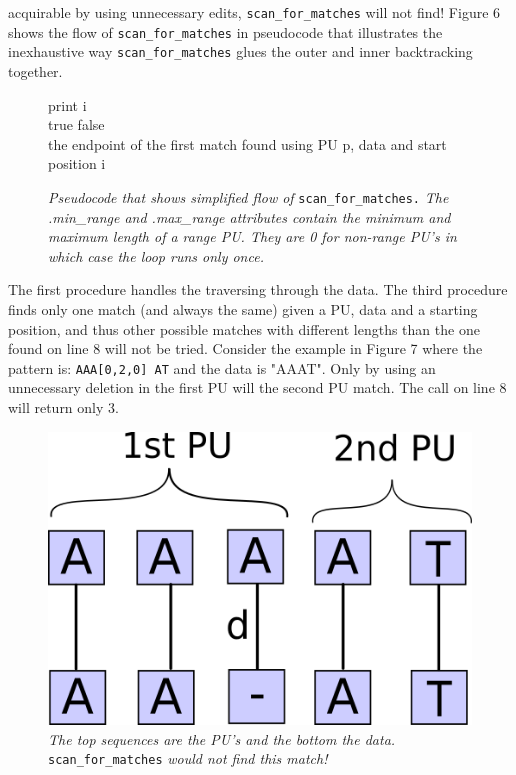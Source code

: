 \documentclass[12pt]{article}
\newcommand{\scm}{\texttt{scan\_for\_matches} }
\newcommand{\scmp}{\texttt{scan\_for\_matches.} }
\newcommand{\pu}{PU }
\newcommand{\pus}{PU's }
\newcommand{\pup}{PU. }
\begin{document}
acquirable by using unnecessary edits, \scm will not find!
Figure 6 shows the flow of \scm in pseudocode that illustrates the 
inexhaustive way \scm glues the outer and inner backtracking together.
\begin{figure}[H]
\begin{center}
\begin{algorithmic}[1]
        \State print i
      \EndIf
    \EndFor
  \EndProcedure \\
          \State \Return true
	    \EndIf
	  \EndIf
    \EndFor
    \State \Return false
  \EndProcedure \\
    \State \Return the endpoint of the first match found using PU p, data and start position i
  \EndProcedure
\end{algorithmic}
\end{center}
\caption{\textit{Pseudocode that shows simplified flow of} \scmp \textit{The .min\_range and .max\_range attributes
contain the minimum and maximum length of a range \pup They are 0 for non-range PU's in which case the loop runs
only once.}}
\end{figure}
\noindent The first procedure handles the traversing through the data. The third procedure finds only one match (and always 
the same) given a PU, data and a starting position, and thus other possible matches with different lengths than the
one found on line 8 will not be tried. Consider the example in Figure 7 where
the pattern is: \texttt{AAA[0,2,0] AT} and the data is "AAAT". Only by using an unnecessary deletion in the first
\pu will the second \pu match. The call on line 8 will return only 3.
\begin{figure}[H]
\begin{center}
\includegraphics[scale=0.3]{Diagrams/scnfail.png}
\end{center}
\caption{\textit{The top sequences are the \pus and the bottom the data.} \scm \textit{would not find this match!}}
\end{figure}
\end{document}
